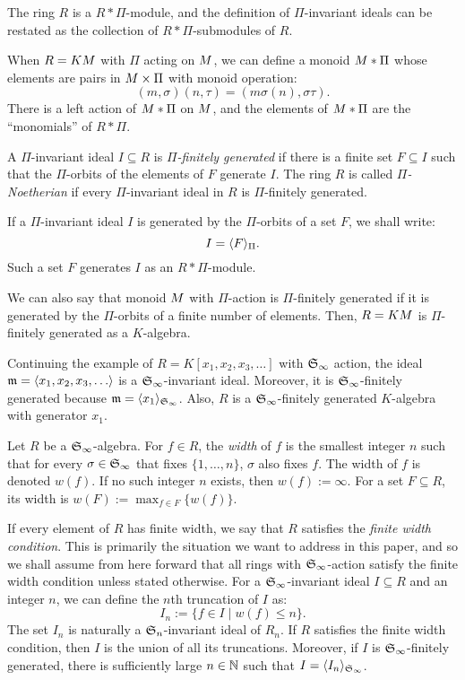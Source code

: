 The ring $R$ is a $R*\Pi$-module, and the definition of $\Pi$-invariant ideals can be restated as the collection of $R*\Pi$-submodules of $R$.

When $R = KM$ with $\Pi$ acting on $M$, we can define a monoid $M *\Pi$ whose elements are pairs in $M \times \Pi$ with monoid operation:
 \[ (m, \sigma)(n, \tau) = (m\sigma(n), \sigma\tau). \]
There is a left action of $M*\Pi$ on $M$, and the elements of $M *\Pi$ are the ``monomials'' of $R*\Pi$.

\begin{definition}
 A $\Pi$-invariant ideal $I \subseteq R$ is {\em $\Pi$-finitely generated} if there is a finite set $F \subseteq I$ such that the $\Pi$-orbits of the elements of $F$ generate $I$.  The ring $R$ is called {\em $\Pi$-Noetherian} if every $\Pi$-invariant ideal in $R$ is $\Pi$-finitely generated.
\end{definition}
If a $\Pi$-invariant ideal $I$ is generated by the $\Pi$-orbits of a set $F$, we shall write:
 \[ I = \langle F \rangle_{\Pi}. \]
Such a set $F$ generates $I$ as an $R*\Pi$-module.

We can also say that monoid $M$ with $\Pi$-action is $\Pi$-finitely generated if it is generated by the $\Pi$-orbits of a finite number of elements.  Then, $R = KM$ is $\Pi$-finitely generated as a $K$-algebra.

\begin{example}
Continuing the example of $R = K[x_1,x_2,x_3,\ldots]$ with $\mathfrak S_\infty$ action, the ideal $\mathfrak m = \langle x_1,x_2,x_3,\ldots \rangle$ is a $\mathfrak S_\infty$-invariant ideal.  Moreover, it is $\mathfrak S_\infty$-finitely generated because $\mathfrak m = \langle x_1 \rangle_{\mathfrak S_\infty}$.  Also, $R$ is a $\mathfrak S_\infty$-finitely generated $K$-algebra with generator $x_1$.
\end{example}
 

\begin{definition}
 Let $R$ be a $\mathfrak S_\infty$-algebra.  For $f \in R$, the {\em width} of $f$ is the smallest integer $n$ such that for every $\sigma \in \mathfrak S_\infty$ that fixes $\{1,\ldots,n\}$, $\sigma$ also fixes $f$.  The width of $f$ is denoted $w(f)$.  If no such integer $n$ exists, then $w(f) := \infty$.  For a set $F \subseteq R$, its width is $w(F) := \max_{f \in F}\{w(f)\}$.
\end{definition}
If every element of $R$ has finite width, we say that $R$ satisfies the {\em finite width condition}.  This is primarily the situation we want to address in this paper, and so we shall assume from here forward that all rings with $\mathfrak S_\infty$-action satisfy the finite width condition unless stated otherwise.  For a $\mathfrak S_\infty$-invariant ideal $I \subseteq R$ and an integer $n$, we can define the $n$th truncation of $I$ as:
 \[ I_n := \{ f \in I \mid w(f) \leq n \}. \]
The set $I_n$ is naturally a $\mathfrak S_n$-invariant ideal of $R_n$.  If $R$ satisfies the finite width condition, then $I$ is the union of all its truncations.  Moreover, if $I$ is $\mathfrak S_\infty$-finitely generated, there is sufficiently large $n \in \mathbb N$ such that $I = \langle I_n \rangle_{\mathfrak S_\infty}$.

